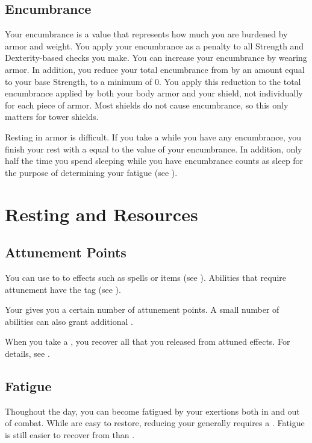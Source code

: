     \subsection{Encumbrance}\label{Encumbrance}
        Your encumbrance is a value that represents how much you are burdened by armor and weight.
        You apply your encumbrance as a penalty to all Strength and Dexterity-based checks you make.
        You can increase your encumbrance by wearing armor.
        In addition, you reduce your total encumbrance from  by an amount equal to your base Strength, to a minimum of 0.
        You apply this reduction to the total encumbrance applied by both your body armor and your shield, not individually for each piece of armor.
        Most shields do not cause encumbrance, so this only matters for tower shields.

        Resting in armor is difficult.
        If you take a  while you have any encumbrance, you finish your rest with a  equal to the value of your encumbrance.
        In addition, only half the time you spend sleeping while you have encumbrance counts as sleep for the purpose of determining your fatigue (see ).

\section{Resting and Resources}

    \subsection{Attunement Points}\label{Attunement Points}
        You can use  to  to effects such as spells or items (see ).
        Abilities that require attunement have the  tag (see ).

        Your  gives you a certain number of attunement points.
        A small number of abilities can also grant additional .

        When you take a , you recover all  that you released from attuned effects.
        For details, see .

    \subsection{Fatigue}\label{Fatigue}
        Thoughout the day, you can become fatigued by your exertions both in and out of combat.
        While  are easy to restore, reducing your  generally requires a .
        Fatigue is still easier to recover from than .

